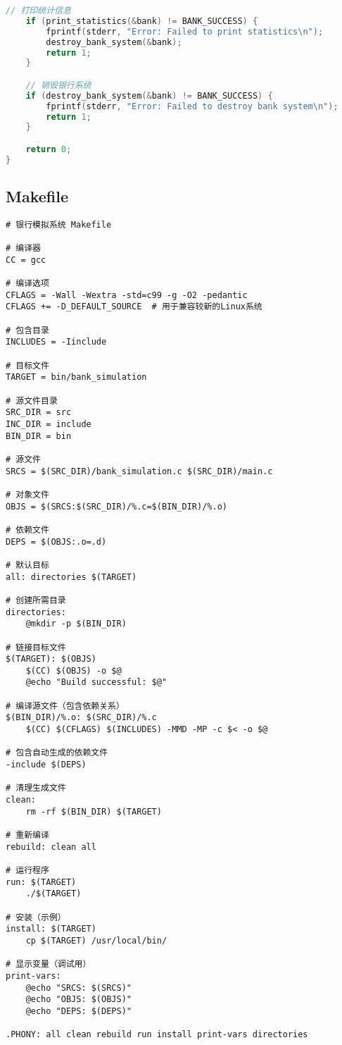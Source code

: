 \documentclass[12pt,a4paper]{article}
\begin{document}
\begin{lstlisting}[language=C,caption=main.c]
    // 打印统计信息
    if (print_statistics(&bank) != BANK_SUCCESS) {
        fprintf(stderr, "Error: Failed to print statistics\n");
        destroy_bank_system(&bank);
        return 1;
    }

    // 销毁银行系统
    if (destroy_bank_system(&bank) != BANK_SUCCESS) {
        fprintf(stderr, "Error: Failed to destroy bank system\n");
        return 1;
    }

    return 0;
}
\end{lstlisting}

\subsection{Makefile}
\begin{lstlisting}[caption=Makefile]
# 银行模拟系统 Makefile

# 编译器
CC = gcc

# 编译选项
CFLAGS = -Wall -Wextra -std=c99 -g -O2 -pedantic
CFLAGS += -D_DEFAULT_SOURCE  # 用于兼容较新的Linux系统

# 包含目录
INCLUDES = -Iinclude

# 目标文件
TARGET = bin/bank_simulation

# 源文件目录
SRC_DIR = src
INC_DIR = include
BIN_DIR = bin

# 源文件
SRCS = $(SRC_DIR)/bank_simulation.c $(SRC_DIR)/main.c

# 对象文件
OBJS = $(SRCS:$(SRC_DIR)/%.c=$(BIN_DIR)/%.o)

# 依赖文件
DEPS = $(OBJS:.o=.d)

# 默认目标
all: directories $(TARGET)

# 创建所需目录
directories:
	@mkdir -p $(BIN_DIR)

# 链接目标文件
$(TARGET): $(OBJS)
	$(CC) $(OBJS) -o $@
	@echo "Build successful: $@"

# 编译源文件（包含依赖关系）
$(BIN_DIR)/%.o: $(SRC_DIR)/%.c
	$(CC) $(CFLAGS) $(INCLUDES) -MMD -MP -c $< -o $@

# 包含自动生成的依赖文件
-include $(DEPS)

# 清理生成文件
clean:
	rm -rf $(BIN_DIR) $(TARGET)

# 重新编译
rebuild: clean all

# 运行程序
run: $(TARGET)
	./$(TARGET)

# 安装（示例）
install: $(TARGET)
	cp $(TARGET) /usr/local/bin/

# 显示变量（调试用）
print-vars:
	@echo "SRCS: $(SRCS)"
	@echo "OBJS: $(OBJS)"
	@echo "DEPS: $(DEPS)"

.PHONY: all clean rebuild run install print-vars directories
\end{lstlisting}
\end{document}
